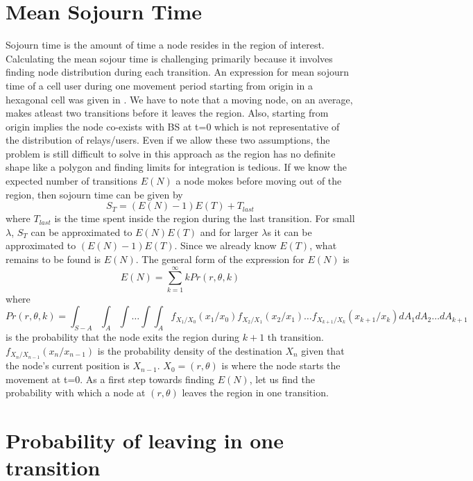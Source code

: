 \section{Mean Sojourn Time}
Sojourn time is the amount of time a node resides in the region of interest. Calculating the mean sojour time is challenging primarily because it involves finding node distribution during each transition. An expression for  mean sojourn time of a cell user during one movement period starting from origin in a hexagonal cell was given in \cite{lin}. We have to note that
a moving node, on an average, makes atleast two transitions before it leaves
the region. Also, starting from origin implies the node co-exists with BS at
t=0 which is not representative of the distribution of relays/users. Even if we
allow these two assumptions, the problem is still difficult to solve in this
approach as the region has no definite shape like a polygon and finding limits
for integration is tedious. 
	If we know the expected number of transitions $E(N)$ a node mokes before moving out of the
region, then sojourn time can be given by
\begin{equation*}
	S_T = (E(N)-1)E(T) + T_{last}
\end{equation*}
where $T_{last}$ is the time spent inside the region during the last transition. For small $\lambda$, $S_T$ can be approximated to $E(N)E(T)$ and for larger $\lambda$s it can be approximated to $(E(N)-1)E(T)$. Since we already know $E(T)$, what remains to be found is $E(N)$. The 
general form of the expression for $E(N)$ is
\begin{equation*}
	E(N) = \sum_{k=1}^{\infty} k Pr(r,\theta,k)
\end{equation*}
where 
\begin{equation*}
	Pr(r,\theta,k) = \int_{S-A} \int_A \int \ldots \int \int_A f_{X_1/X_0}(x_1/x_0)f_{X_2/X_1}(x_2/x_1)\ldots f_{X_{k+1}/X_{k}}(x_{k+1}/x_{k}) dA_1 dA_2\ldots dA_{k+1}
\end{equation*} is the probability that the node exits the region during $k+1$ th transition. 
$f_{X_n/X_{n-1}}(x_n/x_{n-1})$ is the probability density of the destination $X_n$ given that
the node's current position is $X_{n-1}$. $X_0 = (r,\theta)$ is where the node starts the  movement at t=0. 
As a first step towards finding $E(N)$, let us find the probability with which a node at $(r,\theta)$ leaves the region in one transition.

\section{Probability of leaving in one transition}

